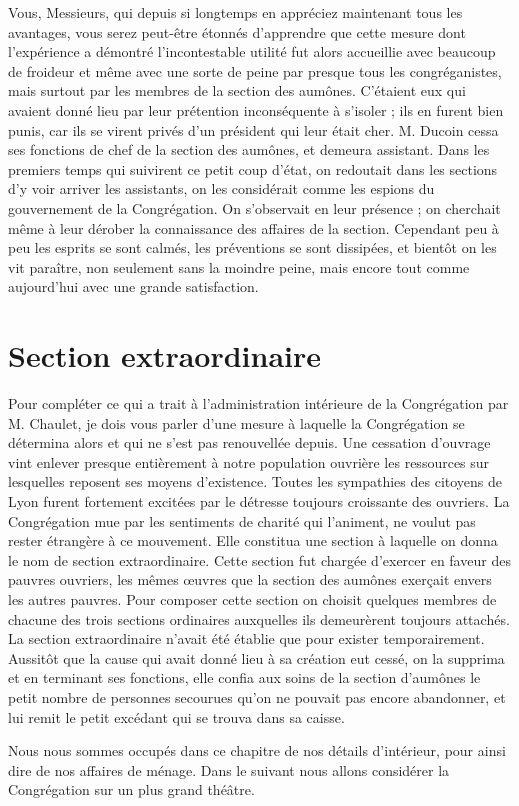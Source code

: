 Vous, Messieurs, qui depuis si longtemps en appréciez maintenant tous les avantages, vous serez peut-être étonnés d'apprendre que cette
mesure dont l'expérience a démontré l'incontestable utilité fut alors accueillie avec beaucoup de froideur et même avec une sorte de peine par presque tous les congréganistes, mais surtout par les membres de la section des aumônes. C'étaient eux qui avaient donné lieu par leur prétention inconséquente à s'isoler ; ils en furent bien punis, car ils se virent privés d'un président qui leur était cher. M. Ducoin cessa ses fonctions de chef de la section des aumônes, et demeura assistant. Dans les premiers temps qui suivirent ce petit coup d'état, on redoutait dans les sections d'y voir arriver les assistants, on les considérait comme les espions du gouvernement de la Congrégation. On s'observait en leur présence ; on cherchait même à leur dérober la connaissance des affaires de la section. Cependant peu à peu les esprits se sont calmés, les préventions se sont dissipées, et bientôt on les vit paraître, non seulement sans la moindre peine, mais encore tout comme aujourd'hui avec une grande satisfaction.

\section*{Section extraordinaire}
Pour compléter ce qui a trait à l'administration intérieure de la Congrégation par M. Chaulet, je dois vous parler d'une mesure à laquelle la Congrégation se détermina alors et qui ne s'est pas renouvellée depuis. Une cessation d'ouvrage vint enlever presque entièrement à notre population ouvrière les ressources sur lesquelles reposent ses moyens d'existence. Toutes les sympathies des citoyens de Lyon furent fortement excitées par le détresse toujours croissante des ouvriers. La Congrégation mue par les sentiments de charité qui l'animent, ne voulut pas rester étrangère à ce mouvement. Elle constitua une section à laquelle on donna le nom de section extraordinaire. Cette section fut chargée d'exercer en faveur des pauvres ouvriers, les mêmes œuvres que la section des aumônes exerçait envers les autres pauvres. Pour composer cette section
on choisit quelques membres de chacune des trois sections ordinaires auxquelles ils demeurèrent toujours attachés. La section extraordinaire n'avait été établie que pour exister temporairement. Aussitôt que la cause qui avait donné lieu à sa création eut cessé, on la supprima et en terminant ses fonctions, elle confia aux soins de la section d'aumônes le petit nombre de personnes secourues qu'on ne pouvait pas encore abandonner, et lui remit le petit excédant qui se trouva dans sa caisse.

Nous nous sommes occupés dans ce chapitre de nos détails d'intérieur, pour ainsi dire de nos affaires de ménage. Dans le suivant nous allons considérer la Congrégation sur un plus grand théâtre.
